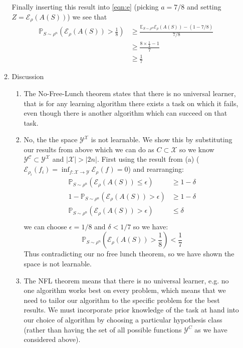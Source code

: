 \documentclass{article}
\newcommand{\err}[2]{\mathcal{E}_{\rho_{#1}}(#2_{#1})}
\newcommand{\prob}[2]{\rho_#1^#2}
\begin{document}
\begin{enumerate}
\begin{enumerate}[label=\alph*.]
    Finally inserting this result into \eqref{eqn:e} (picking $a=7/8$ and setting $Z=\mathcal{E}_{\rho}(A(S))$) we see that
    \begin{align*}
        \mathbb{P}_{S\sim\prob{{}}{n}}\left(\mathcal{E}_{\rho}(A(S))>\frac{1}{8}\right) &\ge \frac{\mathbb{E}_{S\sim\prob{{}}{n}}\mathcal{E}_{\rho}(A(S)) - (1-7/8)}{7/8}\\
        &\ge \frac{8\times\frac{1}{4} - 1}{7} \\
        &\ge \frac{1}{7}
    \end{align*}
    \item Discussion
    \begin{enumerate}
        \item  The No-Free-Lunch theorem states that there is no universal learner, that is for any learning algorithm there exists a task on which it fails, even though there is another algorithm which can succeed on that task.
        \item No, the the space $\mathcal{Y}^\mathcal{X}$ is not learnable. We show this by substituting our results from above which we can do as $C \subset \mathcal{X}$ so we know $\mathcal{Y}^\mathcal{C} \subset \mathcal{Y}^\mathcal{X}$ and $|\mathcal{X}| > |2n|$. First using the result from (a) ($\err{i}{f} = \inf_{f:\mathcal{X}\rightarrow\mathcal{Y}}\err{}{f}=0$) and rearranging:
        \begin{align*}
            \mathbb{P}_{S\sim\prob{{}}{n}}\left(\mathcal{E}_{\rho}(A(S))\le\epsilon\right) &\ge 1 - \delta \\
            1 - \mathbb{P}_{S\sim\prob{{}}{n}}\left(\mathcal{E}_{\rho}(A(S))>\epsilon\right) &\ge 1 - \delta \\
            \mathbb{P}_{S\sim\prob{{}}{n}}\left(\mathcal{E}_{\rho}(A(S))>\epsilon\right) &\le\delta \\
        \end{align*}
        we can choose $\epsilon = 1/8$ and $\delta <1/7$ so we have:
        \begin{equation}
            \mathbb{P}_{S\sim\prob{{}}{n}}\left(\mathcal{E}_{\rho}(A(S))>\frac{1}{8}\right) < \frac{1}{7}
        \end{equation}
        Thus contradicting our no free lunch theorem, so we have shown the space is not learnable.
        \item The NFL theorem means that there is no universal learner, e.g. no one algorithm works best on every problem, which means that we need to tailor our algorithm to the specific problem for the best results. We must incorporate prior knowledge of the task at hand into our choice of algorithm by choosing a particular hypothesis class (rather than having the set of all possible functions $\mathcal{Y}^C$ as we have considered above).

\end{enumerate}
\end{enumerate}
\end{enumerate}
\end{document}
